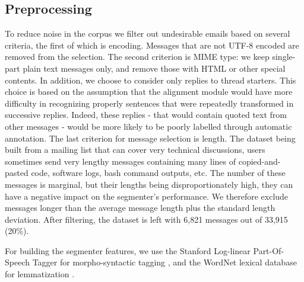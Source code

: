 \subsection{Preprocessing}

To reduce noise in the corpus we filter out undesirable emails based on several criteria, the first of which is encoding. Messages that are not UTF-8 encoded are removed from the selection. The second criterion is MIME type: we keep single-part plain text messages only, and remove those with HTML or other special contents.
%
In addition, we choose to consider only replies to thread starters. This choice is based on the assumption that the alignment module would have more difficulty in recognizing properly sentences that were repeatedly transformed in successive replies. Indeed, these replies - that would contain quoted text from other messages - would be more likely to be poorly labelled through automatic annotation.
%
The last criterion for message selection is length. The dataset being built from a mailing list that can cover very technical discussions, users sometimes send very lengthy messages containing many lines of copied-and-pasted code, software logs, bash command outputs, etc. The number of these messages is marginal, but their lengths being disproportionately high, they can have a negative impact on the segmenter's performance. We therefore exclude messages longer than the average message length plus the standard length deviation.
%
After filtering, the dataset is left with 6,821 messages out of 33,915 (20\%).

For building the segmenter features, we use the Stanford Log-linear Part-Of-Speech Tagger for morpho-syntactic tagging \cite{toutanova2003feature}, and the WordNet lexical database for lemmatization \cite{miller1995wordnet}.

